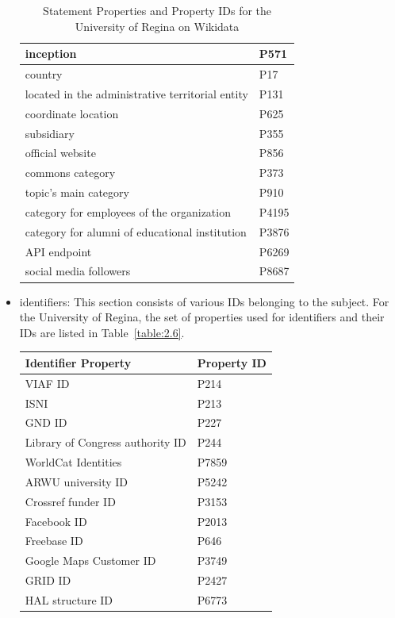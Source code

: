 \begin{doublespace}
\begin{itemize}
\begin{table}[h!]
\begin{tabular}{|l|l|}
     inception & P571\\ \hline
     country & P17\\ \hline
     located in the administrative territorial entity & P131\\ \hline
     coordinate location & P625\\ \hline
     subsidiary & P355\\ \hline
     official website & P856\\ \hline
     commons category & P373\\ \hline
     topic's main category & P910\\ \hline
     category for employees of the organization & P4195\\ \hline
     category for alumni of educational institution & P3876\\ \hline
     API endpoint & P6269\\ \hline
     social media followers & P8687\\ \hline
    \end{tabular}
    \caption{Statement Properties and Property IDs for the University of Regina on Wikidata}
    \label{table:2.5}
    \end{table}
    \item identifiers: This section consists of various IDs belonging to the subject. For the University of Regina, the set of properties used for identifiers and their IDs are listed in Table~\ref{table:2.6}.
    \begin{table}[h!]
    \centering
    \begin{tabular}{|l|l|} 
    \hline Identifier Property \ & Property ID \\ \hline
     VIAF ID & P214\\ \hline
     ISNI & P213\\ \hline
     GND ID & P227\\ \hline
     Library of Congress authority ID & P244\\ \hline
     WorldCat Identities & P7859\\ \hline
     ARWU university ID & P5242\\ \hline
     Crossref funder ID & P3153\\ \hline
     Facebook ID & P2013\\ \hline
     Freebase ID & P646\\ \hline
     Google Maps Customer ID & P3749\\ \hline
     GRID ID & P2427\\ \hline
     HAL structure ID & P6773\\ \hline

\end{tabular}
\end{table}
\end{itemize}
\end{doublespace}
